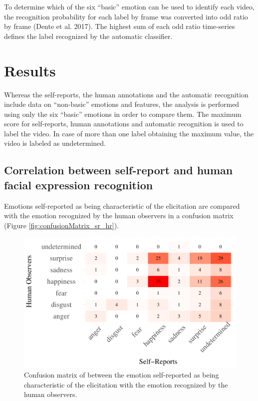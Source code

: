 \documentclass[conference,final,]{IEEEtran}
\makeatletter
\def\maxwidth{\ifdim\Gin@nat@width>\linewidth\linewidth
\else\Gin@nat@width\fi}
\let\Oldincludegraphics\includegraphics
\renewcommand{\includegraphics}[1]{\Oldincludegraphics[width=\maxwidth]{#1}}
\makeatother
\begin{document}
To determine which of the six ``basic'' emotion can be used to identify
each video, the recognition probability for each label by frame was
converted into odd ratio by frame (Dente et al. 2017). The highest sum
of each odd ratio time-series defines the label recognized by the
automatic classifier.

\hypertarget{results}{%
\section{Results}\label{results}}

Whereas the self-reports, the human annotations and the automatic
recognition include data on ``non-basic'' emotions and features, the
analysis is performed using only the six ``basic'' emotions in order to
compare them. The maximum score for self-reports, human annotations and
automatic recognition is used to label the video. In case of more than
one label obtaining the maximum value, the video is labeled as
undetermined.

\hypertarget{correlation-between-self-report-and-human-facial-expression-recognition}{%
\subsection{Correlation between self-report and human facial expression
recognition}\label{correlation-between-self-report-and-human-facial-expression-recognition}}

Emotions self-reported as being characteristic of the elicitation are
compared with the emotion recognized by the human observers in a
confusion matrix (Figure \ref{fig:confusionMatrix_sr_hr}).

\begin{figure}
\centering
\includegraphics{ACII_2019_paper_files/figure-latex/confusionMatrix_sr_hr-1.pdf}
\caption{Confusion matrix of between the emotion self-reported as being
characteristic of the elicitation with the emotion recognized by the
human observers.}
\end{figure}
\end{document}
